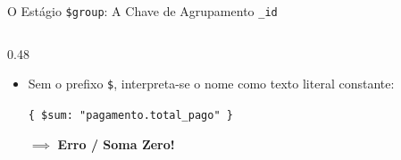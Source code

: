 \begin{frame}[fragile]{O Estágio \texttt{\$group}: A Chave de Agrupamento \texttt{\_id}}
\begin{columns}[t,onlytextwidth]
\begin{column}{0.48\textwidth}
\begin{itemize}
				\vspace{0.15cm}
				\raggedright
				\item Sem o prefixo \texttt{\$}, interpreta-se o nome como texto literal constante:
				
				\vspace{0.15cm}
				\centering
				\lstinline[language=mongosh, basicstyle=\footnotesize\ttfamily]|{ $sum: "pagamento.total_pago" }|
				\par\vspace{0.1cm}
				$\implies$ \textcolor{red!80!black}{\textbf{Erro / Soma Zero!}}
			\end{itemize}
		\end{column}
		
	\end{columns}
\end{frame}

